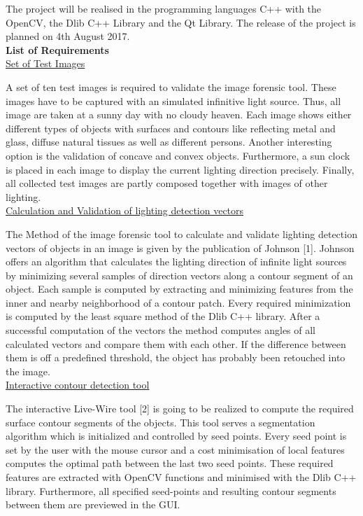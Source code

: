 The project will be realised in the programming languages C++ with the OpenCV, the Dlib C++ Library and the Qt Library. The release of the project is planned on 4th August 2017. \\

\textbf{List of Requirements}\\

\underline{Set of Test Images}

A set of ten test images is required to validate the image forensic tool. These images have to be captured with an simulated infinitive light source. Thus, all image are taken at a sunny day with no cloudy heaven. Each image shows either different types of objects with surfaces and contours like reflecting metal and glass, diffuse natural tissues as well as different persons. Another interesting option is the validation of concave and convex objects. 
Furthermore, a sun clock is placed in each image to display the current lighting direction precisely. Finally, all collected test images are partly composed together with images of other lighting.\\


\underline{Calculation and Validation of lighting detection vectors }

The Method of the image forensic tool to calculate and validate lighting detection vectors of objects in an image is given by the publication of Johnson [1]. Johnson offers an algorithm that calculates the lighting direction of infinite light sources by minimizing several samples of direction vectors along a contour segment of an object. Each sample is computed by extracting and minimizing features from the inner and nearby neighborhood of a contour patch. Every required minimization is computed by the least square method of the Dlib C++ library.
After a successful computation of the vectors the method computes angles of all calculated vectors and compare them with each other. If the difference between them is off a predefined threshold, the object has probably been retouched into the image. \\


\underline{Interactive contour detection tool} 

The interactive Live-Wire tool [2] is going to be realized to compute the required surface contour segments of the objects. This tool serves a segmentation algorithm which is initialized and controlled by seed points. Every seed point is set by the user with the mouse cursor and a cost minimisation of local features computes the optimal path between the last two seed points. These required features are extracted with OpenCV functions and minimised with the Dlib C++ library. Furthermore, all specified seed-points and resulting contour segments between them are previewed in the GUI. \\


